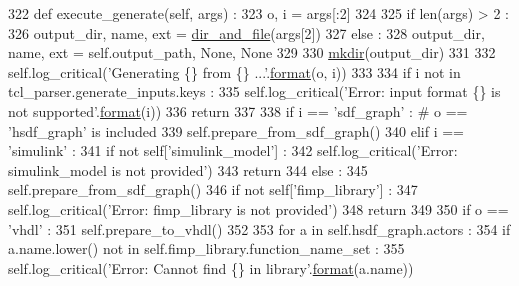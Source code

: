 \begin{DoxyCode}
322   \textcolor{keyword}{def }execute\_generate(self, args) :
323     o, i = args[:2]
324 
325     \textcolor{keywordflow}{if} len(args) > 2 :
326       output\_dir, name, ext = \hyperlink{namespacesylva_1_1misc_1_1util_a0ce6d1d719234031353b60ac60f2af0d}{dir\_and\_file}(args[2])
327     \textcolor{keywordflow}{else} :
328       output\_dir, name, ext = self.output\_path, \textcolor{keywordtype}{None}, \textcolor{keywordtype}{None}
329 
330     \hyperlink{namespacesylva_1_1misc_1_1util_af426e429c40209bbb46e3a0e8f139a44}{mkdir}(output\_dir)
331 
332     self.log\_critical(\textcolor{stringliteral}{'Generating \{\} from \{\} ...'}.\hyperlink{namespacesylva_1_1examples_1_1hsdfg_ab3510a0b8457362330aa4d9fd2209590}{format}(o, i))
333 
334     \textcolor{keywordflow}{if} i \textcolor{keywordflow}{not} \textcolor{keywordflow}{in} tcl\_parser.generate\_inputs.keys :
335       self.log\_critical(\textcolor{stringliteral}{'Error: input format \{\} is not supported'}.\hyperlink{namespacesylva_1_1examples_1_1hsdfg_ab3510a0b8457362330aa4d9fd2209590}{format}(i))
336       \textcolor{keywordflow}{return}
337 
338     \textcolor{keywordflow}{if} i == \textcolor{stringliteral}{'sdf\_graph'} : \textcolor{comment}{# o == 'hsdf\_graph' is included}
339       self.prepare\_from\_sdf\_graph()
340     \textcolor{keywordflow}{elif} i == \textcolor{stringliteral}{'simulink'} :
341       \textcolor{keywordflow}{if} \textcolor{keywordflow}{not} self[\textcolor{stringliteral}{'simulink\_model'}] :
342         self.log\_critical(\textcolor{stringliteral}{'Error: simulink\_model is not provided'})
343         \textcolor{keywordflow}{return}
344       \textcolor{keywordflow}{else} :
345         self.prepare\_from\_sdf\_graph()
346       \textcolor{keywordflow}{if} \textcolor{keywordflow}{not} self[\textcolor{stringliteral}{'fimp\_library'}] :
347         self.log\_critical(\textcolor{stringliteral}{'Error: fimp\_library is not provided'})
348         \textcolor{keywordflow}{return}
349 
350     \textcolor{keywordflow}{if} o == \textcolor{stringliteral}{'vhdl'} :
351       self.prepare\_to\_vhdl()
352 
353       \textcolor{keywordflow}{for} a \textcolor{keywordflow}{in} self.hsdf\_graph.actors :
354         \textcolor{keywordflow}{if} a.name.lower() \textcolor{keywordflow}{not} \textcolor{keywordflow}{in} self.fimp\_library.function\_name\_set :
355           self.log\_critical(\textcolor{stringliteral}{'Error: Cannot find \{\} in library'}.\hyperlink{namespacesylva_1_1examples_1_1hsdfg_ab3510a0b8457362330aa4d9fd2209590}{format}(a.name))

\end{DoxyCode}
